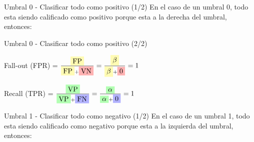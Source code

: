 \documentclass{beamer}
\begin{document}
\begin{frame}{Umbral 0 - Clasificar todo como positivo (1/2)}
    En el caso de un umbral 0, todo esta siendo calificado como positivo porque esta a la derecha del umbral, entonces:

    \begin{center}
    \end{center}
\end{frame}

\begin{frame}{Umbral 0 - Clasificar todo como positivo (2/2)}
    \begin{center}
    Fall-out (FPR) = $\frac{\colorbox{yellow!30}{FP}}{\colorbox{yellow!30}{FP} + \colorbox{red!30}{VN}} = \frac{\colorbox{yellow!30}{$\beta$}}{\colorbox{yellow!30}{$\beta$} + \colorbox{red!30}{0}} = 1$

    Recall (TPR) = $\frac{\colorbox{green!30}{VP}}{\colorbox{green!30}{VP} + \colorbox{blue!30}{FN}} = \frac{\colorbox{green!30}{$\alpha$}}{\colorbox{green!30}{$\alpha$} + \colorbox{blue!30}{0}} = 1$
    \end{center}
\end{frame}

\begin{frame}{Umbral 1 - Clasificar todo como negativo (1/2)}
    En el caso de un umbral 1, todo esta siendo calificado como negativo porque esta a la izquierda del umbral, entonces:

    \begin{center}
    \end{center}
\end{frame}
\end{document}
